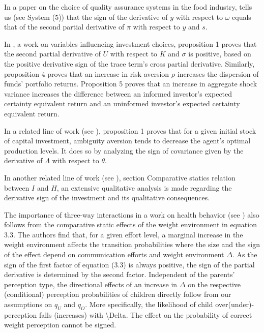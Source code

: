 \documentclass[11pt]{book}
\begin{document}
In a paper on the choice
of quality assurance systems in the food industry, \cite{carriquiry2007reputations} tells us (see System (5)) that the
sign of the derivative of $y$ with respect to $\omega$ equals that
of the second partial derivative of $\pi$ with respect to $y$ and
$s$.

In \cite{kacperczyk2009rational}, a work on variables influencing investment choices, proposition 1  proves that the second
partial derivative of $U$ with respect to $K$ and $\sigma$ is positive,
based on the positive derivative sign of the trace term's cross partial
derivative. Similarly, proposition 4 proves that an increase in risk
aversion $\rho$ increases the dispersion of funds' portfolio returns.
Proposition 5 proves that an increase in aggregate shock variance
increases the difference between an informed investor's expected certainty
equivalent return and an uninformed investor's expected certainty
equivalent return.

In a related line of work (see \cite{jouvet2012irreversible}), proposition 1 proves that for a
given initial stock of capital investment, ambiguity aversion tends
to decrease the agent's optimal production levels. It does so by analyzing
the sign of covariance given by the derivative of $\Lambda$ with
respect to $\theta$.

In another related line of work (see \cite{laporte2015should}), section \textquotedbl Comparative statics relation between
$I$ and $H$\textquotedbl{}, an extensive
qualitative analysis is made regarding the derivative sign of the
investment and its qualitative consequences.

The importance of three-way interactions in a work on health behavior (see \cite{kucher2019health})
also follows from the comparative static effects of the weight environment
in equation 3.3. The authors find that, for a given effort level,
a marginal increase in the weight environment affects the transition
probabilities where the size and the sign of the effect depend on communication
efforts and weight environment $\Delta$. As the sign of the first
factor of equation (3.3) is always positive, the sign of the partial
derivative is determined by the second factor. Independent of the
parents' perception type, the directional effects of an increase in
$\Delta$ on the respective (conditional) perception probabilities
of children directly follow from our assumptions on $q_{U}$ and $q_{O}$.
More specifically, the likelihood of child over(under)-perception
falls (increases) with \textbackslash Delta. The effect on the probability
of correct weight perception cannot be signed.
\end{document}
